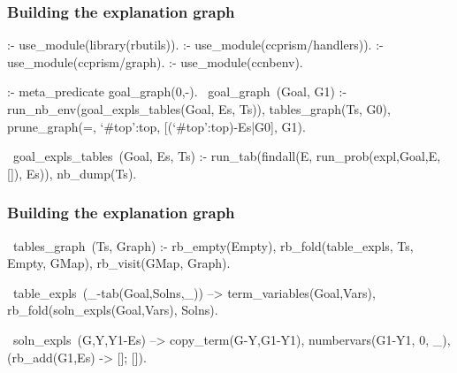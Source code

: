 \documentclass[usenames,dvipsnames]{beamer}
\newenvironment{isframe}[1][untitled]{\begin{frame}[fragile=singleslide,environment=isframe]\frametitle{#1}}{\end{frame}}
\begin{document}
\begin{isframe}[Building the explanation graph]
\begin{prolog}[xleftmargin=0em,basicstyle=\small]
	:- use_module(library(rbutils)).
	:- use_module(ccprism/handlers)).
	:- use_module(ccprism/graph).
	:- use_module(ccnbenv).

	:- meta_predicate goal_graph(0,-).
	~goal_graph~(Goal, G1) :-
     run_nb_env(goal_expls_tables(Goal, Es, Ts)),
		 tables_graph(Ts, G0),
		 prune_graph(=, `#top':top, [(`#top':top)-Es|G0], G1).

  ~goal_expls_tables~(Goal, Es, Ts) :-
    run_tab(findall(E, run_prob(expl,Goal,E,[]), Es)),
    nb_dump(Ts).
\end{prolog}
\end{isframe}

\begin{isframe}[Building the explanation graph]
\begin{prolog}[xleftmargin=0em,basicstyle=\small]
	~tables_graph~(Ts, Graph) :-
		 rb_empty(Empty),
		 rb_fold(table_expls, Ts, Empty, GMap),
		 rb_visit(GMap, Graph).

	~table_expls~(_-tab(Goal,Solns,_)) -->
		 {term_variables(Goal,Vars)},
		 rb_fold(soln_expls(Goal,Vars), Solns).

	~soln_expls~(G,Y,Y1-Es) -->
		 {copy_term(G-Y,G1-Y1), numbervars(G1-Y1, 0, _)},
		 (rb_add(G1,Es) -> []; []).
\end{prolog}
\end{isframe}
\end{document}
